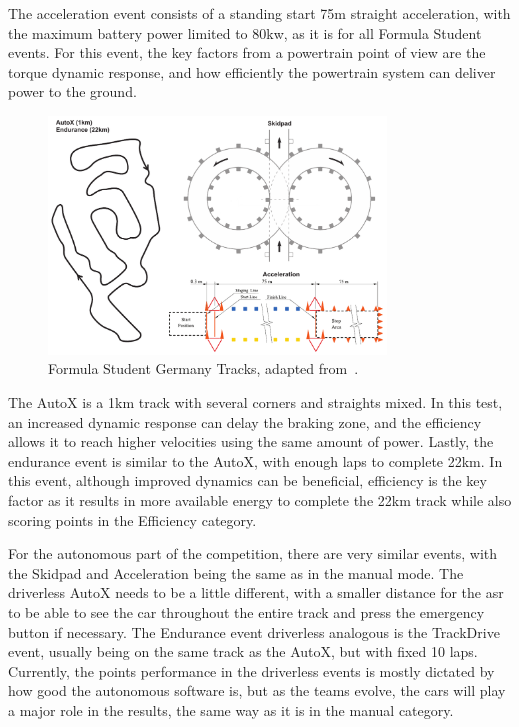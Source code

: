 The acceleration event consists of a standing start 75m straight acceleration, with the maximum battery power limited to 80kw, as it is for all Formula Student events. For this event, the key factors from a powertrain point of view are the torque dynamic response, and how efficiently the powertrain system can deliver power to the ground. 
\begin{figure}[!htb]
	\centering
	\includegraphics[width=0.8\textwidth]{Figures/Tracks.pdf}
	\caption[Formula Student Germany Tracks.]{Formula Student Germany Tracks, adapted from~\cite{FSG:rules:2023}.}
	\label{fig:fs_tracks} %
\end{figure}
The AutoX is a 1km track with several corners and straights mixed. In this test, an increased dynamic response can delay the braking zone, and the efficiency allows it to reach higher velocities using the same amount of power. Lastly, the endurance event is similar to the AutoX, with enough laps to complete 22km. In this event, although improved dynamics can be beneficial, efficiency is the key factor as it results in more available energy to complete the 22km track while also scoring points in the Efficiency category. 

For the autonomous part of the competition, there are very similar events, with the Skidpad and Acceleration being the same as in the manual mode. The driverless AutoX needs to be a little different, with a smaller distance for the \gls{asr} to be able to see the car throughout the entire track and press the emergency button if necessary. The Endurance event driverless analogous is the TrackDrive event, usually being on the same track as the AutoX, but with fixed 10 laps. Currently, the points performance in the driverless events is mostly dictated by how good the autonomous software is, but as the teams evolve, the cars will play a major role in the results, the same way as it is in the manual category.


